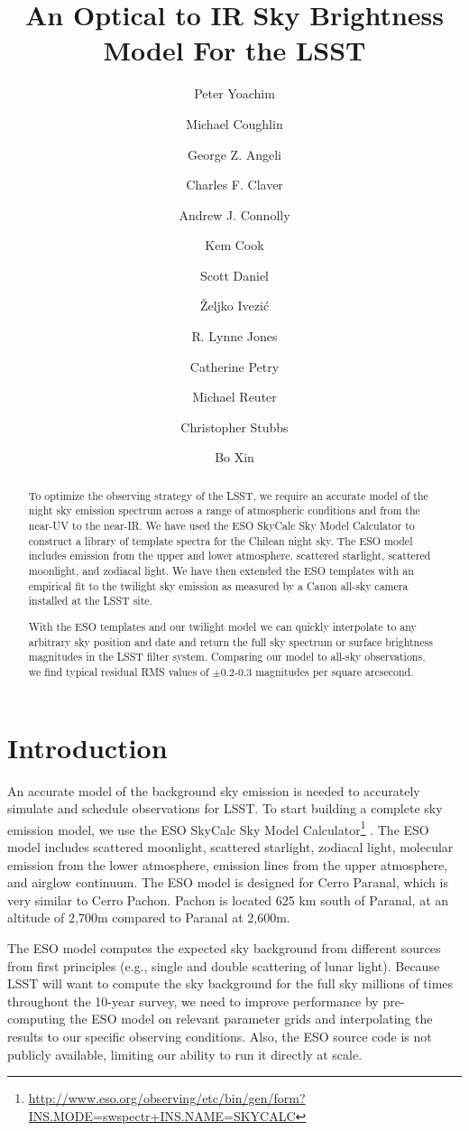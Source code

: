 \documentclass[]{spie}
\title{An Optical to IR Sky Brightness Model For the LSST}
\author[a]{Peter Yoachim}
\author[b]{Michael Coughlin}
\author[c]{George Z. Angeli }
\author[c]{Charles F. Claver }
\author[a]{Andrew J. Connolly}
\author[d]{Kem Cook}
\author[a]{Scott Daniel}
\author[a]{\v{Z}eljko Ivezi\'{c}}
\author[a]{R. Lynne Jones}
\author[c]{Catherine Petry}
\author[c]{Michael Reuter}
\author[b]{Christopher Stubbs}
\author[c]{Bo Xin}
\affil[a]{University of Washington, Seattle, WA, USA}
\affil[b]{Harvard University, Boston, MA, USA}
\affil[c]{LSST Observatory, Tucson, AZ, USA}
\affil[d]{Cook Astronomical Consulting, CA, USA}
\begin{document}
\maketitle

\begin{abstract}
  To optimize the observing strategy of the LSST, we require an accurate model of the night sky emission spectrum across a range of atmospheric conditions and from the near-UV to the near-IR.  We have used the ESO SkyCalc Sky Model Calculator \cite{Noll12,Jones13} to construct a library of template spectra for the Chilean night sky.  The ESO model includes emission from the upper and lower atmosphere, scattered starlight, scattered moonlight, and zodiacal light.
  We have then extended the ESO templates with an empirical fit to the twilight sky emission as measured by a Canon all-sky camera installed at the LSST site.

  With the ESO templates and our twilight model we can quickly interpolate to any arbitrary sky position and date and return the full sky spectrum or surface brightness magnitudes in the LSST filter system. Comparing our model to all-sky observations, we find typical residual RMS values of $\pm$0.2-0.3 magnitudes per square arcsecond.
\end{abstract}


\section{Introduction}

An accurate model of the background sky emission is needed to accurately simulate and schedule observations for LSST.  To start building a complete sky emission model, we use the ESO SkyCalc Sky Model Calculator\footnote{\url{http://www.eso.org/observing/etc/bin/gen/form?} \url{INS.MODE=swspectr+INS.NAME=SKYCALC}} \cite{Noll12,Jones13}.  The ESO model includes scattered moonlight, scattered starlight, zodiacal light, molecular emission from the lower atmosphere, emission lines from the upper atmosphere, and airglow continuum.  The ESO model is designed for Cerro Paranal, which is very similar to Cerro Pachon.  Pachon is located 625 km south of Paranal, at an altitude of 2,700m compared to Paranal at 2,600m.  

The ESO model computes the expected sky background from different sources from first principles (e.g., single and double scattering of lunar light). Because LSST will want to compute the sky background for the full sky millions of times throughout the 10-year survey, we need to improve performance by pre-computing the ESO model on relevant parameter grids and interpolating the results to our specific observing conditions. Also, the ESO source code is not publicly available, limiting our ability to run it directly at scale.
\end{document}
